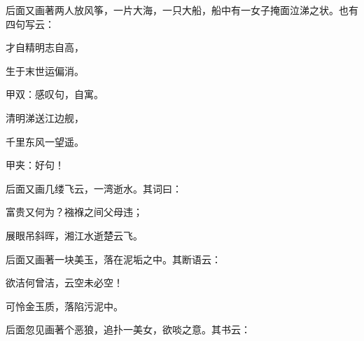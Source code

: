 \begin{parag}
    后面又画著两人放风筝，一片大海，一只大船，船中有一女子掩面泣涕之状。也有四句写云：
\end{parag}


\begin{poem}
    \begin{pl}才自精明志自高，\end{pl}

    \begin{pl}生于末世运偏消。\end{pl}\begin{note}甲双：感叹句，自寓。\end{note}

    \begin{pl}清明涕送江边舰，\end{pl}

    \begin{pl}千里东风一望遥。\end{pl}\begin{note}甲夹：好句！\end{note}
\end{poem}


\begin{parag}
    后面又画几缕飞云，一湾逝水。其词曰：
\end{parag}


\begin{poem}
    \begin{pl}富贵又何为？襁褓之间父母违；\end{pl}

    \begin{pl}展眼吊斜晖，湘江水逝楚云飞。\end{pl}

\end{poem}


\begin{parag}
    后面又画著一块美玉，落在泥垢之中。其断语云：
\end{parag}


\begin{poem}
    \begin{pl}欲洁何曾洁，云空未必空！\end{pl}

    \begin{pl}可怜金玉质，落陷污泥中。\end{pl}
\end{poem}


\begin{parag}
    后面忽见画著个恶狼，追扑一美女，欲啖之意。其书云：
\end{parag}


